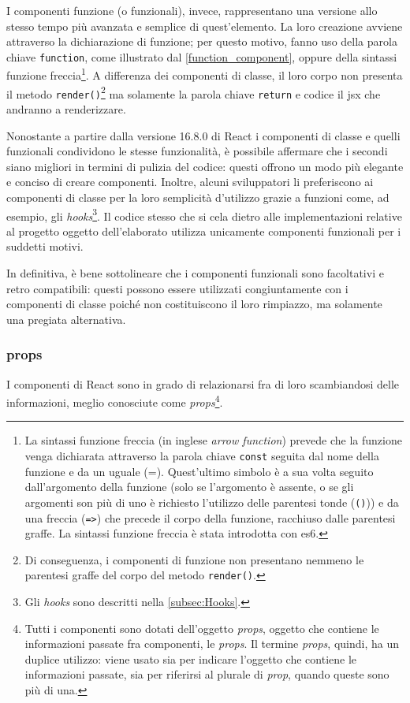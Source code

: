 I componenti funzione (o funzionali), invece, rappresentano una versione allo stesso tempo più avanzata e semplice di quest'elemento. La loro creazione avviene attraverso la dichiarazione di funzione; per questo motivo, fanno uso della parola chiave \texttt{function}, come illustrato dal \autoref{function_component}, oppure della sintassi funzione freccia\footnote{La sintassi funzione freccia (in inglese \textit{arrow function}) prevede che la funzione venga dichiarata attraverso la parola chiave \texttt{const} seguita dal nome della funzione e da un uguale (=). Quest'ultimo simbolo è a sua volta seguito dall'argomento della funzione (solo se l'argomento è assente, o se gli argomenti son più di uno è richiesto l'utilizzo delle parentesi tonde (\texttt{()})) e da una freccia (\texttt{=>}) che precede il corpo della funzione, racchiuso dalle parentesi graffe. La sintassi funzione freccia è stata introdotta con \gls{es6}.}. 
A differenza dei componenti di classe, il loro corpo non presenta il metodo \texttt{render()}\footnote{Di conseguenza, i componenti di funzione non presentano nemmeno le parentesi graffe del corpo del metodo \texttt{render()}.} ma solamente la parola chiave \texttt{return} e codice il \acrshort{jsx} che andranno a renderizzare.



Nonostante a partire dalla versione 16.8.0 di React i componenti di classe e quelli funzionali condividono le stesse funzionalità, è possibile affermare che i secondi siano migliori in termini di pulizia del codice: questi offrono un modo più elegante e conciso di creare componenti. Inoltre, alcuni sviluppatori li preferiscono ai componenti di classe per la loro semplicità d'utilizzo grazie a funzioni come, ad esempio, gli \textit{hooks}\footnote{Gli \textit{hooks} sono descritti nella \autoref{subsec:Hooks}.}. Il codice stesso che si cela dietro alle implementazioni relative al progetto oggetto dell'elaborato utilizza unicamente componenti funzionali per i suddetti motivi.

In definitiva, è bene sottolineare che i componenti funzionali sono facoltativi e retro compatibili: questi possono essere utilizzati congiuntamente con i componenti di classe poiché non costituiscono il loro rimpiazzo, ma solamente una pregiata alternativa.

\subsubsection{props}
I componenti di React sono in grado di relazionarsi fra di loro scambiandosi delle informazioni, meglio conosciute come \textit{props}\footnote{Tutti i componenti sono dotati dell'oggetto \textit{props}, oggetto che contiene le informazioni passate fra componenti, le \textit{props}. Il termine \textit{props}, quindi, ha un duplice utilizzo: viene usato sia per indicare l'oggetto che contiene le informazioni passate, sia per riferirsi al plurale di \textit{prop}, quando queste sono più di una.}.

